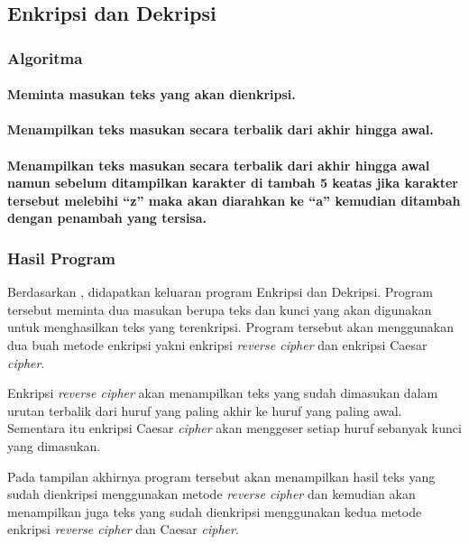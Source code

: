 \documentclass{subfiles}
\begin{document}
\subsection{Enkripsi dan Dekripsi}
\subsubsection{Algoritma}
\paragraph{Meminta masukan teks yang akan dienkripsi.}
\paragraph{Menampilkan teks masukan secara terbalik dari akhir hingga awal.}
\paragraph{Menampilkan teks masukan secara terbalik dari akhir hingga awal namun sebelum
            ditampilkan karakter di tambah 5 keatas jika karakter tersebut melebihi ``z'' maka
            akan diarahkan ke ``a'' kemudian ditambah dengan penambah yang tersisa.}
\subsubsection{\Flowchart}
\subsubsection{\SourceCode}
\begin{indentlevel0}
    
\end{indentlevel0}
\subsubsection{Hasil Program}
\begin{indentlevel0}
    \ilz{}Berdasarkan , didapatkan keluaran program Enkripsi dan Dekripsi. Program tersebut meminta dua masukan berupa teks dan kunci yang akan digunakan untuk menghasilkan teks yang terenkripsi. Program tersebut akan menggunakan dua buah metode enkripsi yakni enkripsi \textit{reverse cipher} dan enkripsi Caesar \textit{cipher}.

    \ilz{}Enkripsi \textit{reverse cipher} akan menampilkan teks yang sudah dimasukan dalam urutan terbalik dari huruf yang paling akhir ke huruf yang paling awal. Sementara itu enkripsi Caesar \textit{cipher} akan menggeser setiap huruf sebanyak kunci yang dimasukan.

    \ilz{}Pada tampilan akhirnya program tersebut akan menampilkan hasil teks yang sudah dienkripsi menggunakan metode \textit{reverse cipher} dan kemudian akan menampilkan juga teks yang sudah dienkripsi menggunakan kedua metode enkripsi \textit{reverse cipher} dan Caesar \textit{cipher}.
\end{indentlevel0}
\end{document}

